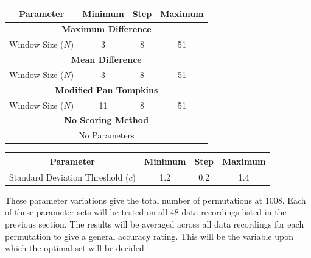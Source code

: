         \begin{center}
            \label{tbl_scoring}
            \begin{tabular}{|c|c|c|c|}
                \hline
                Parameter & Minimum & Step & Maximum \\
                \hline
                \multicolumn{4}{|c|}{\textbf{Maximum Difference}} \\
                \hline
                Window Size ($N$) & 3 & 8 & 51 \\
                \hline
                \multicolumn{4}{|c|}{\textbf{Mean Difference}} \\
                \hline
                Window Size ($N$) & 3 & 8 & 51 \\
                \hline
                \multicolumn{4}{|c|}{\textbf{Modified Pan Tompkins}} \\
                \hline
                Window Size ($N$) & 11 & 8 & 51 \\
                \hline
                \multicolumn{4}{|c|}{\textbf{No Scoring Method}} \\
                \hline
                \multicolumn{4}{|c|}{No Parameters} \\
                \hline
            \end{tabular}
        \end{center}
        \begin{center}
            \label{tbl_detection}
            \begin{tabular}{|c|c|c|c|}
                \hline
                Parameter & Minimum & Step & Maximum \\
                \hline
                Standard Deviation Threshold ($c$) & 1.2 & 0.2 & 1.4 \\
                \hline
            \end{tabular}
        \end{center}

        These parameter variations give the total number of permutations at 1008. Each of these parameter sets will be tested on all 48 data recordings listed in the previous section. The results will be averaged across all data recordings for each permutation to give a general accuracy rating. This will be the variable upon which the optimal set will be decided. 

